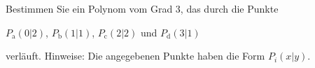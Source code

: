 \begin{ExerciseBlock}
Bestimmen Sie ein Polynom vom Grad 3, das durch die Punkte
\begin{center}
	$P_\text{a}(0|2)$, $P_\text{b}(1|1)$, $P_\text{c}(2|2)$ und $P_\text{d}(3|1)$
\end{center}
verläuft.
Hinweise: Die angegebenen Punkte haben die Form $P_i(x|y)$.

\end{ExerciseBlock}
